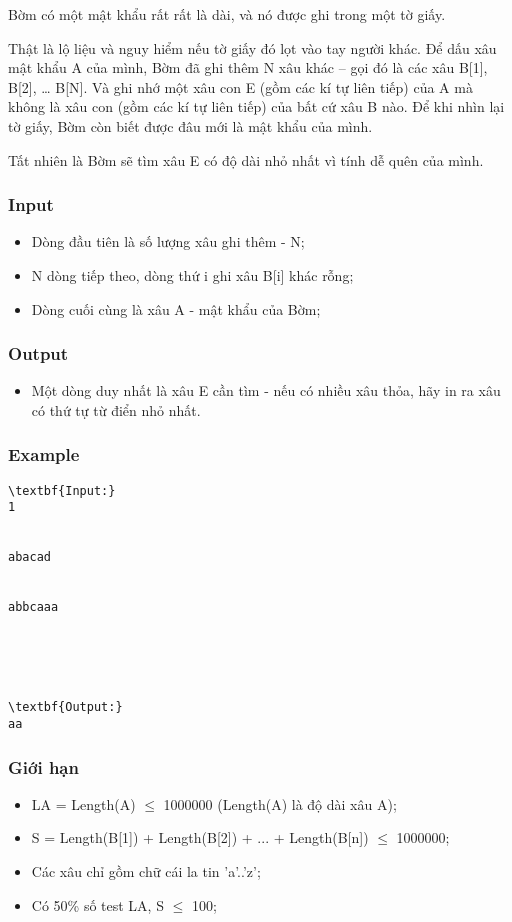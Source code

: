 



   Bờm có một mật khẩu rất rất là dài, và nó được ghi trong một tờ giấy.  

   Thật là lộ liệu và nguy hiểm nếu tờ giấy đó lọt vào tay người khác. Để dấu xâu mật khẩu A của mình, Bờm đã ghi thêm N xâu khác – gọi đó là các xâu B[1], B[2], … B[N]. Và ghi nhớ một xâu con E (gồm các kí tự liên tiếp) của A mà không là xâu con (gồm các kí tự liên tiếp) của bất cứ xâu B nào. Để khi nhìn lại tờ giấy, Bờm còn biết được đâu mới là mật khẩu của mình.  

   Tất nhiên là Bờm sẽ tìm xâu E có độ dài nhỏ nhất vì tính dễ quên của mình.  

\subsubsection{   Input  }
\begin{itemize}
	\item     Dòng đầu tiên là số lượng xâu ghi thêm - N;   
	\item     N dòng tiếp theo, dòng thứ i ghi xâu B[i] khác rỗng;   
	\item     Dòng cuối cùng là xâu A - mật khẩu của Bờm;   
\end{itemize}

\subsubsection{   Output  }
\begin{itemize}
	\item     Một dòng duy nhất là xâu E cần tìm - nếu có nhiều xâu thỏa, hãy in ra xâu có thứ tự từ điển nhỏ nhất.   
\end{itemize}

\subsubsection{   Example  }
\begin{verbatim}
\textbf{Input:}
1


abacad


abbcaaa





\textbf{Output:}
aa\end{verbatim}

\subsubsection{   Giới hạn  }
\begin{itemize}
	\item     LA = Length(A)  $\le$  1000000 (Length(A) là độ dài xâu A);   
	\item     S = Length(B[1]) + Length(B[2]) + ... + Length(B[n])  $\le$  1000000;   
	\item     Các xâu chỉ gồm chữ cái la tin 'a'..'z';   
	\item     Có 50\% số test LA, S  $\le$  100;   
\end{itemize}
